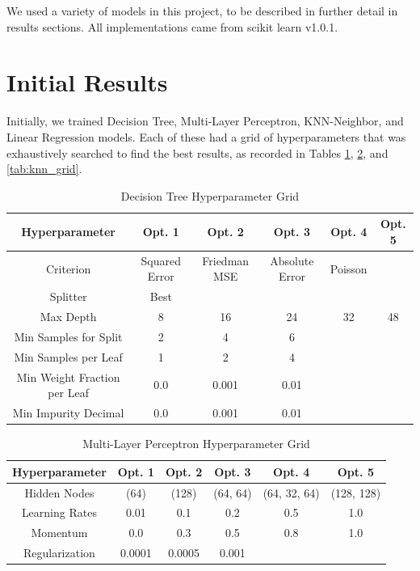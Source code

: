 \documentclass{article}
\begin{document}
We used a variety of models in this project, to be described in further detail
in results sections. All implementations came from scikit learn v1.0.1.

\section{Initial Results}

Initially, we trained Decision Tree, Multi-Layer Perceptron, KNN-Neighbor, and
Linear Regression models. Each of these had a grid of hyperparameters that was
exhaustively searched to find the best results, as recorded in Tables
\ref{tab:dt_grid}, \ref{tab:mlp_grid}, and \ref{tab:knn_grid}.

\begin{table}
	\begin{center}
		\begin{tabular}{||c c c c c c||} 
		\hline\hline
		Hyperparameter & Opt. 1 & Opt. 2 & Opt. 3 & Opt. 4 & Opt. 5 \\ 
		\hline\hline
		Criterion & Squared Error & Friedman MSE & Absolute Error & Poisson & \\ \hline 
		Splitter & Best & & & &  \\ \hline
		Max Depth & 8 & 16 & 24 & 32 & 48 \\ \hline
		Min Samples for Split & 2 & 4 & 6 & &  \\ \hline
		Min Samples per Leaf & 1 & 2 & 4 & &  \\ \hline
		Min Weight Fraction per Leaf & 0.0 & 0.001 & 0.01 & &  \\ \hline
		Min Impurity Decimal & 0.0 & 0.001 & 0.01 & &  \\
		\hline\hline
		\end{tabular}
	\end{center}
	\caption{Decision Tree Hyperparameter Grid}
	\label{tab:dt_grid}
\end{table}

\begin{table}
	\begin{center}
		\begin{tabular}{||c c c c c c||} 
		\hline\hline
		Hyperparameter & Opt. 1 & Opt. 2 & Opt. 3 & Opt. 4 & Opt. 5 \\ 
		\hline\hline
		Hidden Nodes & (64) & (128) & (64, 64) & (64, 32, 64) & (128, 128) \\ \hline
		Learning Rates & 0.01 & 0.1 & 0.2 & 0.5 & 1.0 \\ \hline
		Momentum & 0.0 & 0.3 & 0.5 & 0.8 & 1.0 \\ \hline
		Regularization & 0.0001 & 0.0005 & 0.001 & & \\ 
		\hline\hline
		\end{tabular}
	\end{center}
	\caption{Multi-Layer Perceptron Hyperparameter Grid}
	\label{tab:mlp_grid}
\end{table}
\end{document}
